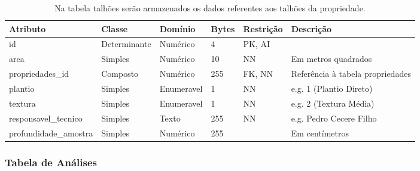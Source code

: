 \begin{landscape}
    \begin{table}[H]
        \centering
        \caption[Tabela \textbf{talhões}]{Na tabela talhões serão armazenados os dados referentes aos talhões da propriedade.
            \label{tab:tabela-er-talhoes}}
        \begin{tabular}{|p{4cm}|p{3cm}|p{2cm}|p{1cm}|p{2cm}|p{8cm}|}
            \hline
            Atributo              & Classe       & Domínio    & Bytes & Restrição & Descrição                        \\\hline
            id                    & Determinante & Numérico   & 4     & PK, AI    &                                  \\\hline
            area                  & Simples      & Numérico   & 10    & NN        & Em metros quadrados              \\\hline
            propriedades\_id      & Composto     & Numérico   & 255   & FK, NN    & Referência à tabela propriedades \\\hline
            plantio               & Simples      & Enumeravel & 1     & NN        & e.g. 1 (Plantio Direto)          \\\hline
            textura               & Simples      & Enumeravel & 1     & NN        & e.g. 2 (Textura Média)           \\\hline
            responsavel\_tecnico  & Simples      & Texto      & 255   & NN        & e.g. Pedro Cecere Filho          \\\hline
            profundidade\_amostra & Simples      & Numérico   & 255   &           & Em centímetros                   \\\hline
        \end{tabular}
    \end{table}

    \subsubsection{Tabela de Análises}
    \label{sec:titSubSecAnalises}


\end{landscape}
